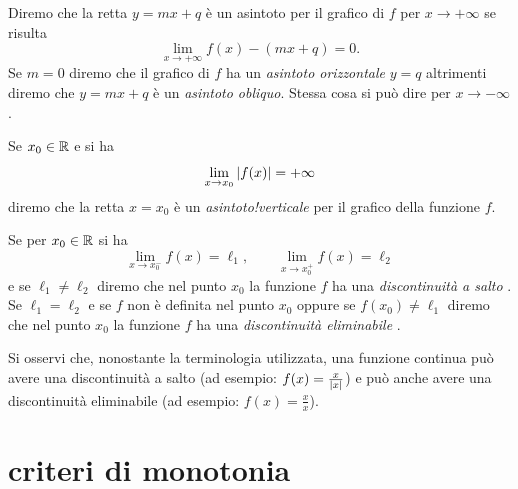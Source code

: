 \begin{definition}[asintoti]
Diremo che la retta $y=mx+q$ è un asintoto per il grafico di $f$ 
per $x\to +\infty$ se risulta
\[
  \lim_{x\to +\infty} f(x) - (mx+q) = 0.
\]
Se $m=0$ diremo che il grafico di $f$ ha un \emph{asintoto orizzontale} $y=q$
%
%
%
%
altrimenti diremo che $y=mx+q$ è un \emph{asintoto obliquo}.
Stessa cosa si può dire per $x\to -\infty$.

Se $x_0\in {\mathbb R}$ e si ha 
\[
  \lim_{x\to x_0} {\left|f(x)\right|} = +\infty
\]
diremo che la retta $x=x_0$ è un \emph{asintoto!verticale}%
%
 per il 
grafico della funzione $f$.
\end{definition}

\begin{definition}
Se per $x_0\in {\mathbb R}$ si ha 
\[
  \lim_{x\to x_0^-} f(x) = \ell_1, 
  \qquad 
  \lim_{x\to x_0^+} f(x) = \ell_2
\]
e se $\ell_1\neq \ell_2$ diremo che nel punto $x_0$ 
la funzione $f$ ha una \emph{discontinuità a salto}%
%
.
Se $\ell_1=\ell_2$ e se $f$ non è definita nel punto $x_0$ 
oppure se $f(x_0)\neq \ell_1$ diremo che 
nel punto $x_0$ la funzione $f$ 
ha una \emph{discontinuità eliminabile}%
%
.
\end{definition}

Si osservi che, nonostante la terminologia utilizzata,
una funzione continua può avere una discontinuità 
a salto (ad esempio: $f(x)=\frac{x}{{\left|x\right|}}$) 
e può anche avere una discontinuità eliminabile
(ad esempio: $f(x) = \frac{x}{x}$).

\section{criteri di monotonia}


